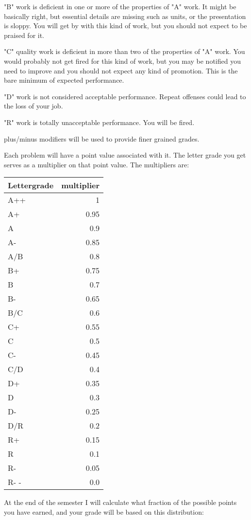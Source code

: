 \documentclass[11pt]{article}
\begin{document}
"B" work is deficient in one or more of the properties of "A" work. It might be basically right, but essential details are missing such as units, or the presentation is sloppy. You will get by with this kind of work, but you should not expect to be praised for it.

"C" quality work is deficient in more than two of the properties of "A" work. You would probably not get fired for this kind of work, but you may be notified you need to improve and you should not expect any kind of promotion. This is the bare minimum of expected performance.

"D" work is not considered acceptable performance. Repeat offenses could lead to the loss of your job.

"R" work is totally unacceptable performance. You will be fired.

plus/minus modifiers will be used to provide finer grained grades.

Each problem will have a point value associated with it. The letter grade you get serves as a multiplier on that point value. The multipliers are:

\begin{center}
\begin{tabular}{lr}
Lettergrade & multiplier\\
\hline
A++ & 1\\
A+ & 0.95\\
A & 0.9\\
A- & 0.85\\
A/B & 0.8\\
B+ & 0.75\\
B & 0.7\\
B- & 0.65\\
B/C & 0.6\\
C+ & 0.55\\
C & 0.5\\
C- & 0.45\\
C/D & 0.4\\
D+ & 0.35\\
D & 0.3\\
D- & 0.25\\
D/R & 0.2\\
R+ & 0.15\\
R & 0.1\\
R- & 0.05\\
R- - & 0.0\\
\end{tabular}
\end{center}

At the end of the semester I will calculate what fraction of the possible points you have earned, and your grade will be based on this distribution:
\end{document}

